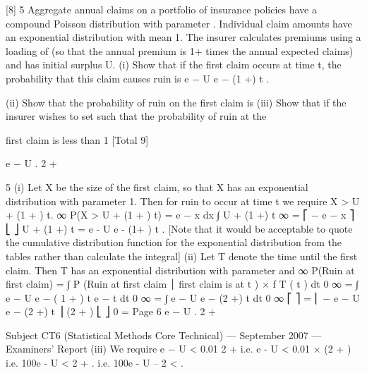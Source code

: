 \documentclass[a4paper,12pt]{article}
\begin{document}
[8]
5
Aggregate annual claims on a portfolio of insurance policies have a compound
Poisson distribution with parameter \lambda. Individual claim amounts have an exponential
distribution with mean 1.
The insurer calculates premiums using a loading of \alpha (so that the annual premium is
1+ \alpha times the annual expected claims) and has initial surplus U.
(i) Show that if the first claim occurs at time t, the probability that this claim
causes ruin is e − U e − (1 +\alpha ) \lambda t .

(ii) Show that the probability of ruin on the first claim is
(iii) Show that if the insurer wishes to set \alpha such that the probability of ruin at the

first claim is less than 1%
[Total 9]

e − U
.
2 +\alpha
[4]

5
(i)
Let X be the size of the first claim, so that X has an exponential distribution
with parameter 1. Then for ruin to occur at time t we require
X > U + (1 + \alpha) \lambda t.
∞
P(X > U + (1 + \alpha) \lambda t) =
e − x dx
∫
U + (1 +\alpha ) \lambda t
∞
= ⎡ − e − x ⎤
⎣
⎦ U + (1 +\alpha ) \lambda t
= e - U e - (1+ \alpha ) \lambda t .
[Note that it would be acceptable to quote the cumulative distribution function
for the exponential distribution from the tables rather than calculate the
integral]
(ii)
Let T denote the time until the first claim. Then T has an exponential
distribution with parameter \lambda and
∞
P(Ruin at first claim) =
∫ P (Ruin at first claim ⏐ first claim is at t ) × f T ( t ) dt
0
∞
= ∫ e − U e − ( 1 + \alpha ) \lambda t \lambda e − \lambda t dt
0
∞
=
∫ e
− U
\lambda e − (2 +\alpha ) \lambda t dt
0
∞
⎡
⎤
\lambda
= ⎢ − e − U
e − (2 +\alpha ) \lambda t ⎥
(2 + \alpha ) \lambda
⎣
⎦ 0
=
Page 6
e − U
.
2 +\alpha


Subject CT6 (Statistical Methods Core Technical) — September 2007 — Examiners’ Report
(iii)
We require
e − U
< 0.01
2 +\alpha
i.e. e - U < 0.01 × (2 + \alpha)
i.e. 100e - U < 2 + \alpha.
i.e. 100e - U – 2 < \alpha.
\end{document}
